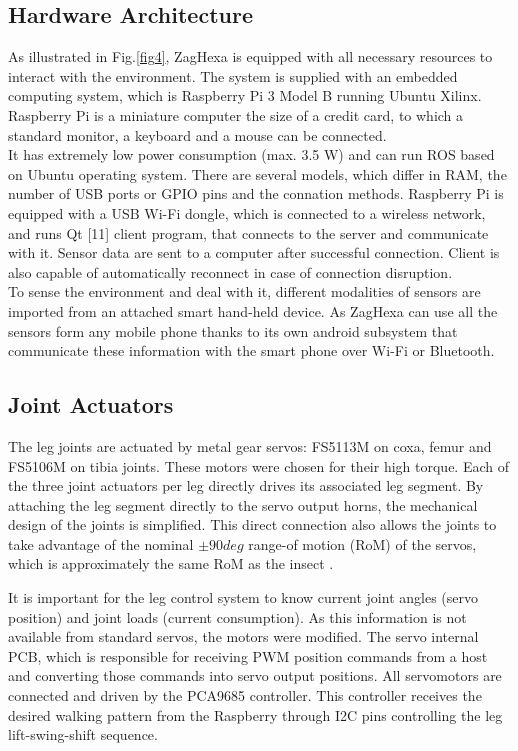 \subsection{Hardware Architecture}
As illustrated in Fig.\ref{fig4}, ZagHexa is equipped with all necessary resources to interact with the environment. The system is supplied with an embedded computing system, which is Raspberry Pi 3 Model B running Ubuntu Xilinx. \\
Raspberry Pi is a miniature computer the size of a credit card, to which a standard monitor, a keyboard and a mouse can be connected.\\
It has extremely low power consumption (max. 3.5 W) and can run ROS based on Ubuntu operating system. There are several models, which differ in RAM, the number of USB ports or GPIO pins and the connation methods. Raspberry Pi is equipped with a USB Wi-Fi dongle, which is connected to a wireless network, and runs Qt [11] client program, that connects to the server and communicate with it. Sensor data are sent to a computer after successful connection. Client is also capable of automatically reconnect in case of connection disruption.\\
To sense the environment and deal with it, different modalities of sensors are imported from an attached smart hand-held device. As ZagHexa can use all the sensors form any mobile phone thanks to its own android subsystem that communicate these information with the smart phone over Wi-Fi or Bluetooth.\\
\subsection{Joint Actuators}
The leg joints are actuated by metal gear servos: FS5113M on coxa, femur and FS5106M on tibia joints. These motors were chosen for their high torque. Each of the three joint actuators per leg directly drives its associated leg segment. By attaching the leg segment directly to the servo output horns, the mechanical design of the joints is simplified.  This direct connection also allows the joints to take advantage of the nominal $\pm90deg$ range-of motion (RoM) of the servos, which is approximately the same RoM as the insect  \cite{17}.

It is important for the leg control system to know current joint angles (servo position) and joint loads (current consumption). As this information is not available from standard servos, the motors were modified. The servo internal PCB, which is responsible for receiving PWM position commands from a host   and   converting   those   commands   into   servo   output positions.
All servomotors are connected and driven by the PCA9685 controller. This controller receives the desired walking pattern from the Raspberry through I2C pins controlling the leg lift-swing-shift sequence.

